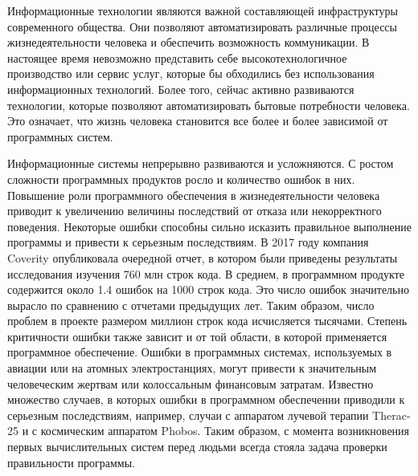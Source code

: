 
{\actuality} Информационные технологии являются важной составляющей инфраструктуры современного общества.
Они позволяют автоматизировать различные процессы жизнедеятельности человека и обеспечить возможность коммуникации.
В настоящее время невозможно представить себе высокотехнологичное производство или сервис услуг, которые бы обходились без использования информационных технологий.
Более того, сейчас активно развиваются технологии, которые позволяют автоматизировать бытовые потребности человека.
Это означает, что жизнь человека становится все более и более зависимой от программных систем.

Информационные системы непрерывно развиваются и усложняются. 
С ростом сложности программных продуктов росло и количество ошибок в них.
Повышение роли программного обеспечения в жизнедеятельности человека приводит к увеличению величины последствий от отказа или некорректного поведения.
Некоторые ошибки способны сильно исказить правильное выполнение программы и привести к серьезным последствиям.
В 2017 году компания Coverity опубликовала очередной отчет, в котором были приведены результаты исследования изучения 760 млн строк кода.
В среднем, в программном продукте содержится около 1.4 ошибок на 1000 строк кода.
Это число ошибок значительно вырасло по сравнению с отчетами предыдущих лет.
Таким образом, число проблем в проекте размером миллион строк кода исчисляется тысячами.
Степень критичности ошибки также зависит и от той области, в которой применяется программное обеспечение.
Ошибки в программных системах, используемых в авиации или на атомных электростанциях, могут привести к значительным человеческим жертвам или колоссальным финансовым затратам.
Известно множество случаев, в которых ошибки в программном обеспечении приводили к серьезным последствиям, например, случаи с аппаратом лучевой терапии Therac-25 и с космическим аппаратом 
Phobos.
Таким образом, с момента возникновения первых вычислительных систем перед людьми всегда стояла задача проверки правильности программы. 


